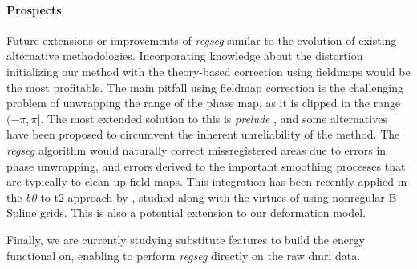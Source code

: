 \paragraph*{Prospects}
Future extensions or improvements of \emph{regseg} similar to the evolution of existing
  alternative methodologies.
Incorporating knowledge about the distortion initializing our method with the theory-based
  correction using fieldmaps would be the most profitable.
The main pitfall using fieldmap correction is the challenging problem of unwrapping the
  range of the phase map, as it is clipped in the range $(-\pi, \pi]$.
The most extended solution to this is \emph{prelude} \citep{jenkinson_fast_2003}, and some
  alternatives have been proposed \citep{daga_susceptibility_2014} to circumvent the
  inherent unreliability of the method.
The \emph{regseg} algorithm would naturally correct missregistered areas due to errors in
  phase unwrapping, and errors derived to the important smoothing processes that are
  typically to clean up field maps.
This integration has been recently applied in the \emph{b0}-to-\gls*{t2} approach
  by \cite{irfanoglu_susceptibility_2011}, studied along with the virtues of using
  nonregular B-Spline grids.
This is also a potential extension to our deformation model.

Finally, we are currently studying substitute features to build the energy functional on,
  enabling to perform \emph{regseg} directly on the raw \gls*{dmri} data.